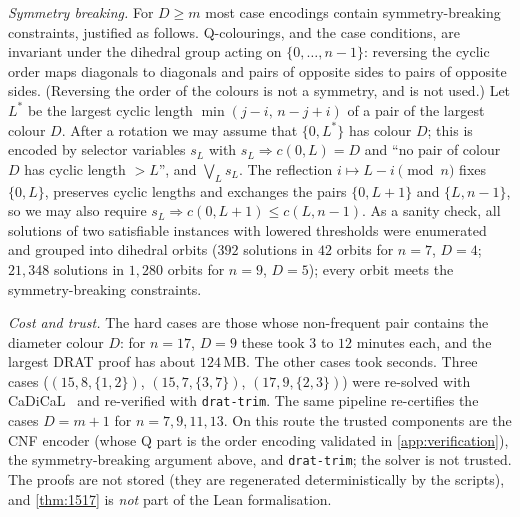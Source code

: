 \documentclass[11pt]{amsart}
\theoremstyle{definition}
\theoremstyle{remark}
\begin{document}
\emph{Symmetry breaking.} For $D\ge m$ most case encodings contain symmetry-breaking constraints, justified as follows. Q-colourings, and the case conditions, are invariant under the dihedral group acting on $\{0,\dots,n-1\}$: reversing the cyclic order maps diagonals to diagonals and pairs of opposite sides to pairs of opposite sides. (Reversing the order of the colours is not a symmetry, and is not used.) Let $L^*$ be the largest cyclic length $\min(j-i,\,n-j+i)$ of a pair of the largest colour $D$. After a rotation we may assume that $\{0,L^*\}$ has colour $D$; this is encoded by selector variables $s_L$ with $s_L\Rightarrow c(0,L)=D$ and ``no pair of colour $D$ has cyclic length $>L$'', and $\bigvee_L s_L$. The reflection $i\mapsto L-i\pmod n$ fixes $\{0,L\}$, preserves cyclic lengths and exchanges the pairs $\{0,L+1\}$ and $\{L,n-1\}$, so we may also require $s_L\Rightarrow c(0,L+1)\le c(L,n-1)$. As a sanity check, all solutions of two satisfiable instances with lowered thresholds were enumerated and grouped into dihedral orbits ($392$ solutions in $42$ orbits for $n=7$, $D=4$; $21{,}348$ solutions in $1{,}280$ orbits for $n=9$, $D=5$); every orbit meets the symmetry-breaking constraints.

\emph{Cost and trust.} The hard cases are those whose non-frequent pair contains the diameter colour $D$: for $n=17$, $D=9$ these took $3$ to $12$ minutes each, and the largest DRAT proof has about $124$\,MB. The other cases took seconds. Three cases ($(15,8,\{1,2\})$, $(15,7,\{3,7\})$, $(17,9,\{2,3\})$) were re-solved with CaDiCaL~\cite{kissat} and re-verified with \texttt{drat-trim}. The same pipeline re-certifies the cases $D=m+1$ for $n=7,9,11,13$. On this route the trusted components are the CNF encoder (whose Q part is the order encoding validated in \cref{app:verification}), the symmetry-breaking argument above, and \texttt{drat-trim}; the solver is not trusted. The proofs are not stored (they are regenerated deterministically by the scripts), and \cref{thm:1517} is \emph{not} part of the Lean formalisation.
\end{document}
